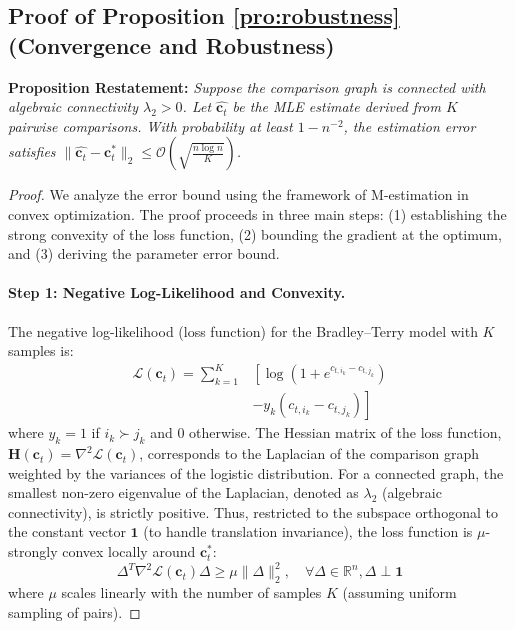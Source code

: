 \documentclass[11pt]{article}
\begin{document}
\subsection{Proof of Proposition \ref{pro:robustness} (Convergence and Robustness)}

\textbf{Proposition Restatement:} \textit{Suppose the comparison graph is connected with algebraic connectivity $\lambda_2 > 0$. Let $\hat{\mathbf{c}_t}$ be the MLE estimate derived from $K$ pairwise comparisons. With probability at least $1 - n^{-2}$, the estimation error satisfies $\|\hat{\mathbf{c}_t} - \mathbf{c}_t^*\|_2 \le \mathcal{O}(\sqrt{\frac{n \log n}{K}})$.}

\begin{proof}
We analyze the error bound using the framework of M-estimation in convex optimization. The proof proceeds in three main steps: (1) establishing the strong convexity of the loss function, (2) bounding the gradient at the optimum, and (3) deriving the parameter error bound.

\paragraph{Step 1: Negative Log-Likelihood and Convexity.}
The negative log-likelihood (loss function) for the Bradley–Terry model with $K$ samples is:
\begin{equation}
\begin{split}
    \mathcal{L}(\mathbf{c}_t) = \sum_{k=1}^K & \left[ \log(1 + e^{c_{t,i_k} - c_{t, j_k}}) \right. \\
    & \left. - y_k(c_{t, i_k} - c_{t, j_k}) \right]
\end{split}
\end{equation}
where $y_k=1$ if $i_k \succ j_k$ and $0$ otherwise.
The Hessian matrix of the loss function, $\mathbf{H}(\mathbf{c}_t) = \nabla^2 \mathcal{L}(\mathbf{c}_t)$, corresponds to the Laplacian of the comparison graph weighted by the variances of the logistic distribution. For a connected graph, the smallest non-zero eigenvalue of the Laplacian, denoted as $\lambda_2$ (algebraic connectivity), is strictly positive.
Thus, restricted to the subspace orthogonal to the constant vector $\mathbf{1}$ (to handle translation invariance), the loss function is $\mu$-strongly convex locally around $\mathbf{c}_t^*$:
\begin{equation}
    \Delta^T \nabla^2 \mathcal{L}(\mathbf{c}_t) \Delta \ge \mu \|\Delta\|_2^2, \quad \forall \Delta \in \mathbb{R}^n, \Delta \perp \mathbf{1}
    \label{eq:strong_convexity}
\end{equation}
where $\mu$ scales linearly with the number of samples $K$ (assuming uniform sampling of pairs).


\end{proof}
\end{document}
